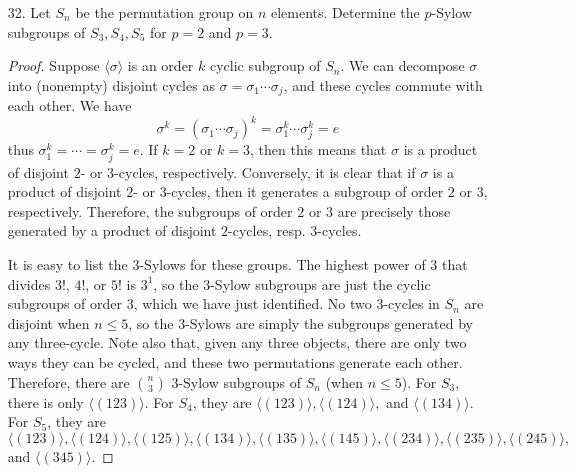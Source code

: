 \documentclass[10pt]{article}
\newcommand{\gen}[1]{\langle #1 \rangle}
\begin{document}
\begin{enumerate}
\begin{proof}
Next, we know that $n_p \in \{2,q,2q\}$.  Since $q > 2$, we cannot have $n_p = 2$ by the same reasoning (that it would imply $2 \equiv 1 \pmod{p}$).  So we can assume $n_p \geq q$.  Finally, we know $n_2 \in \{p,q,pq\}$, so that $n_2 \geq p$.

Each Sylow subgroup is cyclic, and therefore any two Sylows must have trivial intersection.  This means the number of elements accounted for by these Sylows is at least $2p(q-1) + q(p-1) + p(2-1) + 1$.  This number cannot exceed the order of the group, thus
$$
2p(q-1) + q(p-1) + p(2-1) + 1 \leq 2pq
$$
or, equivalently, $(p-1)(q-1) \leq 0$.  The only solutions to this have $p \leq 1$ or $q \leq 1$, a contradiction.  Therefore, some Sylow subgroup is normal.

Let $H$ be this normal Sylow subgroup.  $H$ has order $2$, $p$, or $q$, so is cyclic and hence solvable.  All that remains to show is that $G/H$ is solvable.  $G/H$ has order $pq$, $2q$, or $2p$.  Any group whose order is a product of two primes is solvable, so $G/H$ is solvable.  Thus $G$ is solvable.
\end{proof}

\item[32.] Let $S_n$ be the permutation group on $n$ elements.  Determine the $p$-Sylow subgroups of $S_3, S_4, S_5$ for $p = 2$ and $p=3$.

\begin{proof}
Suppose $\gen{\sigma}$ is an order $k$ cyclic subgroup of $S_n$.  We can decompose $\sigma$ into (nonempty) disjoint cycles as $\sigma = \sigma_1 \cdots \sigma_j$, and these cycles commute with each other.  We have
$$
\sigma^k = (\sigma_1 \cdots \sigma_j)^k = \sigma_1^k \cdots \sigma_j^k = e
$$
thus $\sigma_1^k = \cdots = \sigma_j^k = e$.  If $k = 2$ or $k=3$, then this means that $\sigma$ is a product of disjoint $2$- or $3$-cycles, respectively.  Conversely, it is clear that if $\sigma$ is a product of disjoint $2$- or $3$-cycles, then it generates a subgroup of order $2$ or $3$, respectively.  Therefore, the subgroups of order $2$ or $3$ are precisely those generated by a product of disjoint $2$-cycles, resp. $3$-cycles.

It is easy to list the $3$-Sylows for these groups.  The highest power of $3$ that divides $3!$, $4!$, or $5!$ is $3^1$, so the $3$-Sylow subgroups are just the cyclic subgroups of order $3$, which we have just identified.  No two $3$-cycles in $S_n$ are disjoint when $n \leq 5$, so the $3$-Sylows are simply the subgroups generated by any three-cycle.  Note also that, given any three objects, there are only two ways they can be cycled, and these two permutations generate each other.  Therefore, there are $\binom{n}{3}$ $3$-Sylow subgroups of $S_n$ (when $n \leq 5$).  For $S_3$, there is only $\gen{(123)}$.  For $S_4$, they are $\gen{(123)}, \gen{(124)},$ and $\gen{(134)}$.  For $S_5$, they are $\gen{(123)}, \gen{(124)}, \gen{(125)}, \gen{(134)}, \gen{(135)}, \gen{(145)}, \gen{(234)}, \gen{(235)}, \gen{(245)},$ and $\gen{(345)}$.


\end{proof}
\end{enumerate}
\end{document}
